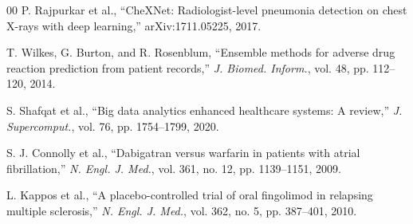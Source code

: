 \documentclass[conference]{IEEEtran}
\begin{document}
\begin{thebibliography}{00}
P. Rajpurkar et al., ``CheXNet: Radiologist-level pneumonia detection on chest X-rays with deep learning,'' arXiv:1711.05225, 2017.

T. Wilkes, G. Burton, and R. Rosenblum, ``Ensemble methods for adverse drug reaction prediction from patient records,'' \textit{J. Biomed. Inform.}, vol. 48, pp. 112--120, 2014.

S. Shafqat et al., ``Big data analytics enhanced healthcare systems: A review,'' \textit{J. Supercomput.}, vol. 76, pp. 1754--1799, 2020.

S. J. Connolly et al., ``Dabigatran versus warfarin in patients with atrial fibrillation,'' \textit{N. Engl. J. Med.}, vol. 361, no. 12, pp. 1139--1151, 2009.

L. Kappos et al., ``A placebo-controlled trial of oral fingolimod in relapsing multiple sclerosis,'' \textit{N. Engl. J. Med.}, vol. 362, no. 5, pp. 387--401, 2010.

\end{thebibliography}
\end{document}
